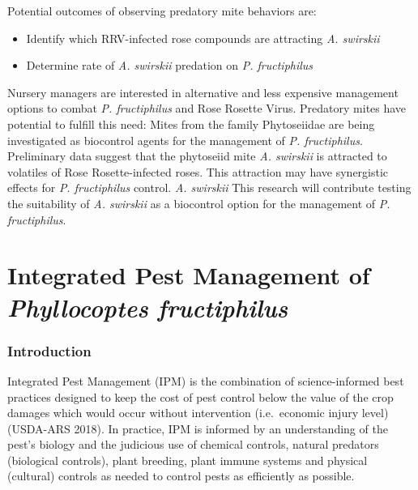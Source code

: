 \documentclass[12pt,final,CPage]{ufthesis}
\begin{document}
{  Potential outcomes of observing predatory mite behaviors are:
  \begin{itemize}
  \item
    Identify which RRV-infected rose compounds are attracting \emph{A. swirskii}
  \item
    Determine rate of \emph{A. swirskii} predation on \emph{P. fructiphilus}
  \end{itemize}
  Nursery managers are interested in alternative and less expensive management options to combat \emph{P. fructiphilus} and Rose Rosette Virus. Predatory mites have potential to fulfill this need: Mites from the family Phytoseiidae are being investigated as biocontrol agents for the management of \emph{P. fructiphilus}. Preliminary data suggest that the phytoseiid mite \emph{A. swirskii} is attracted to volatiles of Rose Rosette-infected roses. This attraction may have synergistic effects for \emph{P. fructiphilus} control. \emph{A. swirskii} This research will contribute testing the suitability of \emph{A. swirskii} as a biocontrol option for the management of \emph{P. fructiphilus}.

  \hypertarget{integrated-pest-management-of-phyllocoptes-fructiphilus}{%
  \chapter{\texorpdfstring{Integrated Pest Management of \emph{Phyllocoptes fructiphilus}}{Integrated Pest Management of Phyllocoptes fructiphilus}}\label{integrated-pest-management-of-phyllocoptes-fructiphilus}}

  \hypertarget{introduction}{%
  \subsection{Introduction}\label{introduction}}

  Integrated Pest Management (IPM) is the combination of science-informed best practices designed to keep the cost of pest control below the value of the crop damages which would occur without intervention (i.e.~economic injury level) (USDA-ARS 2018). In practice, IPM is informed by an understanding of the pest's biology and the judicious use of chemical controls, natural predators (biological controls), plant breeding, plant immune systems and physical (cultural) controls as needed to control pests as efficiently as possible.

}
\end{document}
